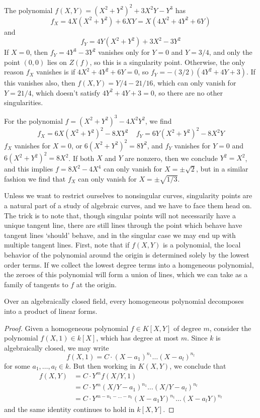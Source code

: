 \begin{example}
    The polynomial $f(X,Y) = (X^2 + Y^2)^2 + 3X^2Y - Y^3$ has
    \[ f_X = 4X(X^2 + Y^2) + 6XY = X(4X^2 + 4Y^2 + 6Y) \]
    and
    \[ f_Y = 4Y(X^2 + Y^2) + 3X^2 - 3Y^2 \]
    If $X = 0$, then $f_Y = 4Y^3 - 3Y^2$ vanishes only for $Y = 0$ and $Y = 3/4$, and only the point $(0,0)$ lies on $Z(f)$, so this is a singularity point. Otherwise, the only reason $f_X$ vanishes is if $4X^2 + 4Y^2 + 6Y = 0$, so $f_Y = -(3/2)(4Y^2 + 4Y + 3)$. If this vanishes also, then $f(X,Y) = Y/4 - 21/16$, which can only vanish for $Y = 21/4$, which doesn't satisfy $4Y^2 + 4Y + 3 = 0$, so there are no other singularities.
\end{example}

\begin{example}
    For the polynomial $f = (X^2 + Y^2)^3 - 4X^2Y^2$, we find
    \[ f_X = 6X(X^2 + Y^2)^2 - 8XY^2\ \ \ \ \ f_Y = 6Y(X^2 + Y^2)^2 - 8X^2Y \]
    $f_X$ vanishes for $X = 0$, or $6(X^2 + Y^2)^2 = 8Y^2$, and $f_Y$ vanishes for $Y = 0$ and $6(X^2 + Y^2)^2 = 8X^2$. If both $X$ and $Y$ are nonzero, then we conclude $Y^2 = X^2$, and this implies $f = 8X^2 - 4X^4$ can only vanish for $X = \pm \sqrt{2}$, but in a similar fashion we find that $f_X$ can only vanish for $X = \pm \sqrt{1/3}$.
\end{example}

Unless we want to restrict ourselves to nonsingular curves, singularity points are a natural part of a study of algebraic curves, and we have to face them head on. The trick is to note that, though singular points will not necessarily have a unique tangent line, there are still lines through the point which behave have tangent lines `should' behave, and in the singular case we may end up with multiple tangent lines. First, note that if $f(X,Y)$ is a polynomial, the local behavior of the polynomial around the origin is determined solely by the lowest order terms. If we collect the lowest degree terms into a homgeneous polynomial, the zeroes of this polynomial will form a union of lines, which we can take as a family of tangents to $f$ at the origin.

\begin{lemma}
    Over an algebraically closed field, every homogeneous polynomial decomposes into a product of linear forms.
\end{lemma}
\begin{proof}
    Given a homogeneous polynomial $f \in K[X,Y]$ of degree $m$, consider the polynomial $f(X,1) \in k[X]$, which has degree at most $m$. Since $k$ is algebraically closed, we may write
    \[ f(X,1) = C \cdot (X - a_1)^{n_1} \dots (X - a_l)^{n_l} \]
    for some $a_1,\dots,a_l \in k$. But then working in $K(X,Y)$, we conclude that
    \begin{align*}
        f(X,Y) &= C \cdot Y^m f(X/Y,1)\\
        &= C \cdot Y^m (X/Y - a_1)^{n_1} \dots (X/Y - a_l)^{n_l}\\
        &= C \cdot Y^{m-n_1-\dots-n_l} (X - a_1 Y)^{n_1} \dots (X - a_l Y)^{n_l}
    \end{align*}
    and the same identity continues to hold in $k[X,Y]$.
\end{proof}

